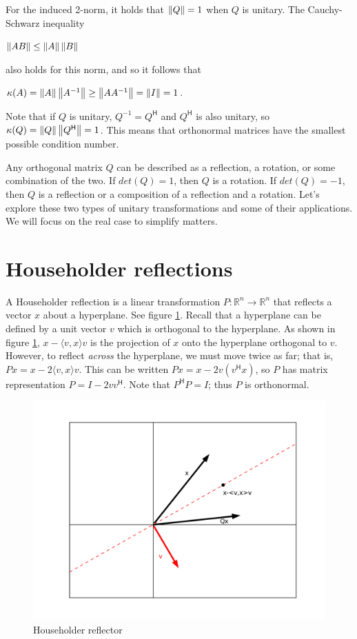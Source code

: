 For the induced 2-norm, it holds that $\left\lVert Q\right\rVert=1$ when $Q$ is unitary.
The Cauchy-Schwarz inequality 

\centerline{$\left\lVert AB\right\rVert \leq \left\lVert A\right\rVert \left\lVert B\right\rVert$}
also holds for this norm, and so it follows that 

\centerline{$\kappa(A) = \left\lVert A\right\rVert \left\lVert A^{-1}\right\rVert \geq \left\lVert A A^{-1}\right\rVert = \left\lVert I\right\rVert = 1$.}


Note that if $Q$ is unitary, $Q^{-1} = Q^\mathsf{H}$ and $Q^\mathsf{H}$ is also unitary, so $\kappa(Q) = \left\lVert Q\right\rVert \left\lVert Q^\mathsf{H}\right\rVert = 1$. This means that orthonormal matrices have the smallest possible condition number.

Any orthogonal matrix $Q$ can be described as a reflection, a rotation, or some combination of the two.
If $det(Q) = 1$, then $Q$ is a rotation.
If $det(Q) = -1$, then $Q$  is a reflection or a composition of a reflection and a rotation. Let's explore these two types of unitary transformations and some of their applications. We will focus on the real case to simplify matters.

\section*{Householder reflections}
A Householder reflection is a linear transformation $P: \mathbb{R}^n \rightarrow \mathbb{R}^n$ that reflects a vector $x$ about a hyperplane.
See figure \ref{fig:Householder_reflector}.
Recall that a hyperplane can be defined by a unit vector $v$ which is orthogonal to the hyperplane. 
As shown in figure \ref{fig:Householder_reflector}, $x - \langle v,x \rangle v$ is the projection of $x$ onto the hyperplane orthogonal to $v$.
However, to reflect \emph{across} the hyperplane, we must move twice as far; that is, $Px = x - 2\langle v,x \rangle v$.
This can be written $Px = x - 2v(v^\mathsf{H} x)$, so $P$ has matrix representation $P = I - 2v v^\mathsf{H}$.
Note that $P^\mathsf{H} P = I$; thus $P$ is orthonormal.

\begin{figure}
\includegraphics[width= \textwidth]{fig1}
\caption{Householder reflector}
\label{fig:Householder_reflector}
\end{figure}

